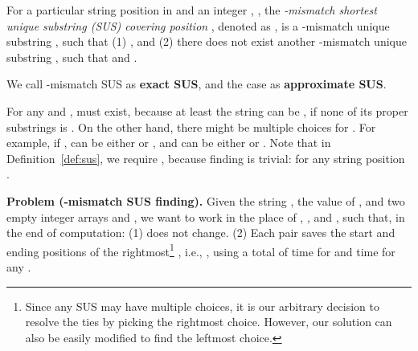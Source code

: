 \documentclass[11pt]{llncs}
\begin{document}
\begin{definition}
\label{def:sus}
For a particular string position  in  and an integer , , the \emph{-mismatch shortest unique substring (SUS)
  covering position }, denoted as , is a -mismatch
unique substring , such that (1) , and (2) there
does not exist another -mismatch unique substring , such
that  and .
\end{definition}

We call -mismatch SUS as {\bf exact SUS},
and the case  as {\bf approximate SUS}.

For any  and ,  must exist, because at least the
string  can be , if none of its proper substrings is
.  On the other hand, there might be multiple choices for
.  For example, if ,  can be
either  or , and  can be
either  or .
Note that in Definition~\ref{def:sus}, we require , because
finding  is trivial:  for any string
position .



\bigskip  

\noindent
{\bf Problem (-mismatch SUS finding).}
Given the string , the value of , and two empty integer arrays
 and , we want to work in the place of , , and , such
that, in the end of computation: (1)  does not change. (2) Each
 pair saves the start and ending positions of the
rightmost\footnote{Since any SUS may have multiple choices, it is our
  arbitrary decision to resolve the ties by picking the rightmost
  choice. However, our solution can also be easily modified to find
  the leftmost choice.}  , i.e., 
,
 using a total of  time for
 and  time for any .
\end{document}
